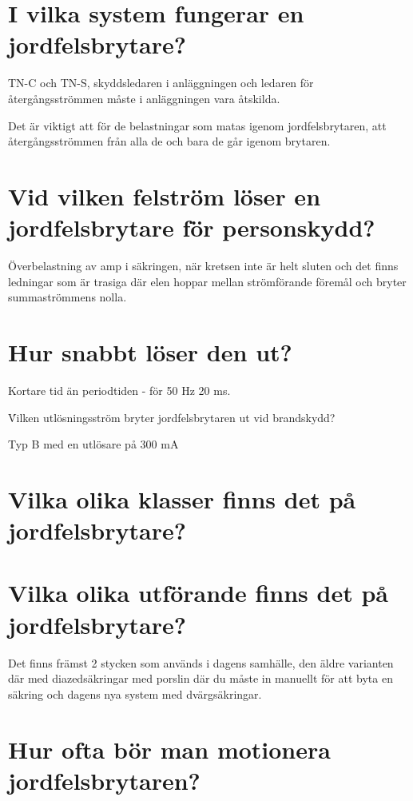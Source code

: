 \documentclass[a4paper,swedish]{article}
\begin{document}
\section{I vilka system fungerar en jordfelsbrytare?}\label{sec:RCD_systems}

TN-C och TN-S, skyddsledaren i anläggningen och ledaren för återgångsströmmen måste i anläggningen vara åtskilda.

Det är viktigt att för de belastningar som matas igenom jordfelsbrytaren, att återgångsströmmen från alla de och
bara de går igenom brytaren.

\section{Vid vilken felström löser en jordfelsbrytare för personskydd?}
\label{sec:q_31}

Överbelastning av amp i säkringen, när kretsen inte är helt sluten och det finns ledningar som är trasiga där elen hoppar mellan strömförande föremål och bryter summaströmmens nolla.

\section{Hur snabbt löser den ut?}\label{sec:RCD_how_fast}

Kortare tid än periodtiden - för 50 Hz  20 ms.

\'{Vilken utlösningsström bryter jordfelsbrytaren ut vid brandskydd?}
\label{q_33}

Typ B med en utlösare på 300 mA

\section{Vilka olika klasser finns det på jordfelsbrytare?}\label{sec:RCD_klasser}

\section{Vilka olika utförande finns det på jordfelsbrytare?}
\label{sec:q_35}

Det finns  främst 2 stycken som används i dagens samhälle, den äldre varianten där med diazedsäkringar med porslin där du måste in manuellt för att byta en säkring och dagens nya system med dvärgsäkringar.

\section{Hur ofta bör man motionera jordfelsbrytaren?}\label{sec:motionering_RCD}
\end{document}
